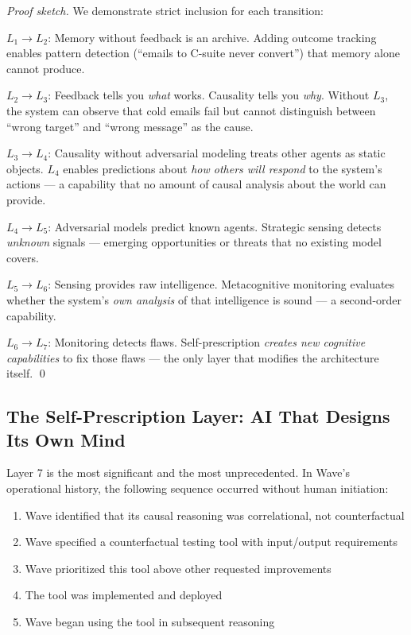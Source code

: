 \documentclass[12pt,a4paper]{article}
\theoremstyle{plain}
\theoremstyle{definition}
\theoremstyle{remark}
\begin{document}
\begin{proof}[Proof sketch]
We demonstrate strict inclusion for each transition:

$L_1 \to L_2$: Memory without feedback is an archive. Adding outcome tracking enables pattern detection (``emails to C-suite never convert'') that memory alone cannot produce.

$L_2 \to L_3$: Feedback tells you \emph{what} works. Causality tells you \emph{why}. Without $L_3$, the system can observe that cold emails fail but cannot distinguish between ``wrong target'' and ``wrong message'' as the cause.

$L_3 \to L_4$: Causality without adversarial modeling treats other agents as static objects. $L_4$ enables predictions about \emph{how others will respond} to the system's actions --- a capability that no amount of causal analysis about the world can provide.

$L_4 \to L_5$: Adversarial models predict known agents. Strategic sensing detects \emph{unknown} signals --- emerging opportunities or threats that no existing model covers.

$L_5 \to L_6$: Sensing provides raw intelligence. Metacognitive monitoring evaluates whether the system's \emph{own analysis} of that intelligence is sound --- a second-order capability.

$L_6 \to L_7$: Monitoring detects flaws. Self-prescription \emph{creates new cognitive capabilities} to fix those flaws --- the only layer that modifies the architecture itself. \qed
\end{proof}

\subsection{The Self-Prescription Layer: AI That Designs Its Own Mind}

Layer 7 is the most significant and the most unprecedented. In Wave's operational history, the following sequence occurred without human initiation:

\begin{enumerate}[nosep]
\item Wave identified that its causal reasoning was correlational, not counterfactual
\item Wave specified a counterfactual testing tool with input/output requirements
\item Wave prioritized this tool above other requested improvements
\item The tool was implemented and deployed
\item Wave began using the tool in subsequent reasoning
\end{enumerate}
\end{document}
